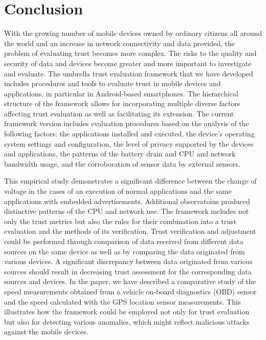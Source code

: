 \section{Conclusion}
With the growing number of mobile devices owned by ordinary citizens all around the world and an increase 
in network connectivity and data provided, the problem of evaluating trust becomes 
more complex.  The risks to
the quality and security of data and devices become greater and more important to investigate and evaluate. The 
umbrella trust evaluation 
framework that we have developed includes procedures and tools to evaluate trust in mobile devices and applications, in particular in Android-based smartphones. 
The  hierarchical structure of the framework allows for incorporating multiple diverse factors affecting trust evaluation as well as facilitating its extension.
The current framework version includes evaluation procedures based on the analysis of the following factors: the applications installed and executed, the device’s operating system settings and configuration, the level of privacy supported by the devices and applications, the patterns of the battery drain and CPU and network bandwidth usage,
and the corroboration of sensor data by external sensors.

This empirical study demonstrates a significant difference between the change of voltage in the cases of an execution 
of normal applications and the same applications with embedded advertisements.  Additional observatoins produced distinctive patterns of the CPU and network use.
The framework includes not only the trust metrics but also the rules for their combination into a trust
evaluation and the methods of its verification. 
Trust verification and adjustment could be performed through comparison of data received from different data sources on the 
same device as well as by comparing the data originated from various devices. A significant discrepancy between data 
originated from various sources should result in decreasing trust assessment for the corresponding data sources and devices. 
In the paper, we have described a comparative study of the speed measurements obtained from a vehicle on-board diagnostics (OBD)  sensor 
and the speed calculated 
with the GPS location sensor measurements. This illustrates how the framework could be employed not only for trust evaluation 
but also for detecting various anomalies, which might reflect malicious attacks against the mobile devices.
